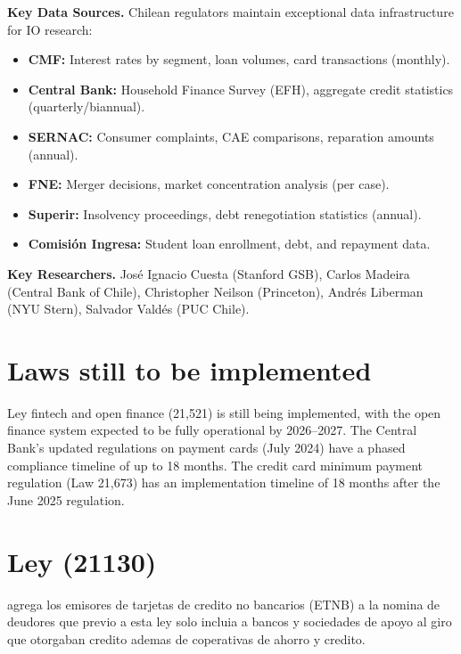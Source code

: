 \documentclass[12pt]{article}
\theoremstyle{plain}
\theoremstyle{plain}
\theoremstyle{definition}  %
\theoremstyle{remark}  %
\begin{document}
\medskip
\noindent \textbf{Key Data Sources.} Chilean regulators maintain exceptional data infrastructure for IO research:
\begin{itemize}
    \item \textbf{CMF:} Interest rates by segment, loan volumes, card transactions (monthly).
    \item \textbf{Central Bank:} Household Finance Survey (EFH), aggregate credit statistics (quarterly/biannual).
    \item \textbf{SERNAC:} Consumer complaints, CAE comparisons, reparation amounts (annual).
    \item \textbf{FNE:} Merger decisions, market concentration analysis (per case).
    \item \textbf{Superir:} Insolvency proceedings, debt renegotiation statistics (annual).
    \item \textbf{Comisi\'{o}n Ingresa:} Student loan enrollment, debt, and repayment data.
\end{itemize}

\noindent \textbf{Key Researchers.} Jos\'{e} Ignacio Cuesta (Stanford GSB), Carlos Madeira (Central Bank of Chile), Christopher Neilson (Princeton), Andr\'{e}s Liberman (NYU Stern), Salvador Vald\'{e}s (PUC Chile).


\section{Laws still to be implemented}

Ley fintech and open finance (21,521) is still being implemented, with the open finance system expected to be fully operational by 2026--2027. The Central Bank's updated regulations on payment cards (July 2024) have a phased compliance timeline of up to 18 months. The credit card minimum payment regulation (Law 21,673) has an implementation timeline of 18 months after the June 2025 regulation.

\newpage 

\section{Ley  (21130)}

agrega los emisores de tarjetas de credito no bancarios (ETNB) a la nomina de deudores que previo a esta ley solo incluia a bancos y sociedades de apoyo al giro que otorgaban credito ademas de coperativas de ahorro y credito. 
\end{document}

